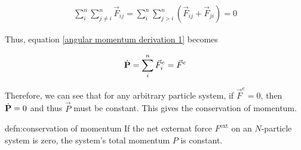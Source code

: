 \begin{align}
\sum_{i}^{n}\sum_{j\neq i}^{n} \vec{F}_{ij} = \sum_{i}^{n}\sum_{j > i}^{n} \left(\vec{F}_{ij} + \vec{F}_{ji}\right) = 0
\end{align} 

Thus, equation \ref{angular momentum derivation 1} becomes

\begin{align}
\dot{\text{\textbf{P}}} = \sum_{i}^{n} \vec{F}_i^e = \vec{F}^e
\end{align}

Therefore, we can see that for any arbitrary particle system, if $\vec{F}^e = 0$, then $\dot{\text{\textbf{P}}} = 0$ and thus $\vec{P}$ must be constant. This gives the conservation of momentum.

\begin{defn}{defn:conservation of momentum}
If the net externat force $F^{\text{ext}}$ on an $N$-particle system is zero, the system's total momentum $P$ is constant.
\end{defn}

















